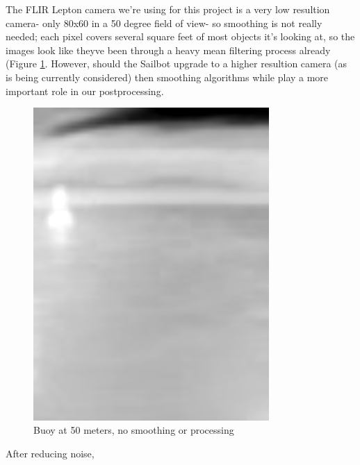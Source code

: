 The FLIR Lepton camera we're using for this project is a very low resultion camera- only 80x60 in a 50 degree field of view- so smoothing is not really needed; each pixel covers several square feet of most objects it's looking at, so the images look like theyve been through a heavy mean filtering process already (Figure \ref{fig:buoy_ex}. However, should the Sailbot upgrade to a higher resultion camera (as is being currently considered) then smoothing algorithms while play a more important role in our postprocessing. 

\begin{figure}
\centering
\includegraphics[width=0.8\textwidth]{"./image/buoy_example"}
\caption{Buoy at 50 meters, no smoothing or processing}
\label{fig:buoy_ex}
\end{figure}

After reducing noise, 